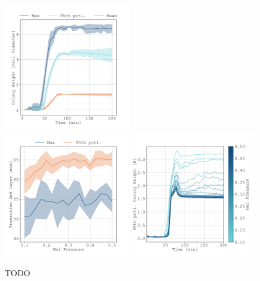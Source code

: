 \documentclass{article}
\begin{document}
\begin{figure}[H]
    \centering
    \includegraphics[width=0.49\textwidth]
        {docs/source/_static/scripts/crm_multilayer/multilayer-time-evolution.pdf}\\
    \includegraphics[width=0.49\textwidth]
        {docs/source/_static/scripts/crm_multilayer/colony-height-vs-gel_pressure.pdf}
    \includegraphics[width=0.49\textwidth]
        {docs/source/_static/scripts/crm_multilayer/colony-height-vs-time.pdf}
    \caption{TODO}
    \label{fig:multilayer}
\end{figure}
\end{document}
